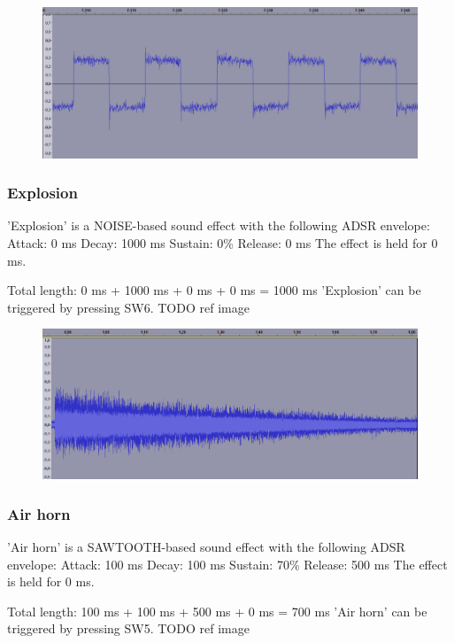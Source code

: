 \begin{figure}[H]
	\includegraphics[width = \textwidth]{images/SW4zoom.png}
	\caption{}
	\label{img-sw4zoom}
\end{figure}

\subsubsection{Explosion}

'Explosion' is a NOISE-based sound effect with the following ADSR envelope:
Attack: 0 ms
Decay:  1000 ms
Sustain: 0\%
Release: 0 ms
The effect is held for 0 ms.

Total length: 0 ms + 1000 ms + 0 ms + 0 ms = 1000 ms
'Explosion' can be triggered by pressing SW6.
TODO ref image

\begin{figure}[H]
	\includegraphics[width = \textwidth]{images/SW6.png}
	\caption{}
	\label{img-protracker}
\end{figure}


\subsubsection{Air horn}
'Air horn' is a SAWTOOTH-based sound effect with the following ADSR envelope:
Attack: 100 ms
Decay:  100 ms
Sustain: 70\%
Release: 500 ms
The effect is held for 0 ms.

Total length: 100 ms + 100 ms + 500 ms + 0 ms = 700 ms
'Air horn' can be triggered by pressing SW5.
TODO ref image

